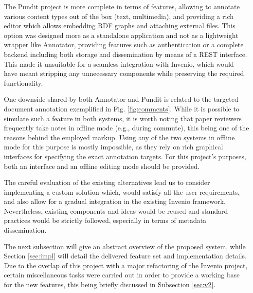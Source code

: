 The Pundit project is more complete in terms of features, allowing to annotate
various content types out of the box (text, multimedia), and providing a rich
editor which allows embedding RDF graphs and attaching external files. This
option was designed more as a standalone application and not as a lightweight
wrapper like Annotator, providing features such as authentication or a
complete backend including both storage and dissemination by means of a REST
interface.  This made it unsuitable for a seamless integration with Invenio,
which would have meant stripping any unnecessary components while preserving
the required functionality.

One downside shared by both Annotator and Pundit is related to the targeted
document annotation exemplified in Fig. \ref{fig:comments}. While it is
possible to simulate such a feature in both systems, it is worth noting that
paper reviewers frequently take notes in offline mode (e.g., during commute),
this being one of the reasons behind the employed markup. Using any of the two
systems in offline mode for this purpose is mostly impossible, as they rely on
rich graphical interfaces for specifying the exact annotation targets. For
this project's purposes, both an interface and an offline editing mode should
be provided.

The careful evaluation of the existing alternatives lead us to consider
implementing a custom solution which, would satisfy all the user requirements,
and also allow for a gradual integration in the existing Invenio framework.
Nevertheless, existing components and ideas would be reused and standard
practices would be strictly followed, especially in terms of metadata
dissemination.

The next subsection will give an abstract overview of the proposed system,
while Section \ref{sec:impl} will detail the delivered feature set and
implementation details. Due to the overlap of this project with a major
refactoring of the Invenio project, certain miscellaneous tasks were carried
out in order to provide a working base for the new features, this being briefly
discussed in Subsection \ref{sec:v2}.
